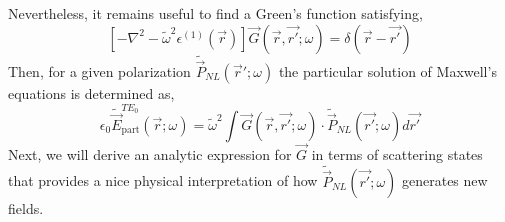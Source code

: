 \documentclass[12pt]{article}
\begin{document}
Nevertheless, it remains useful to find a Green’s function satisfying,
\begin{equation*}
\left[ -\nabla^2 - \tilde{\omega}^2 \epsilon^{(1)}(\vec{r}) \right] \vec{G}(\vec{r}, \vec{r'}; \omega) = \delta(\vec{r} - \vec{r'})
\end{equation*}
Then, for a given polarization $\tilde{\vec{P}}_{NL}(\vec{r}'; \omega)$ the particular solution of Maxwell's equations is determined as,
\begin{equation*}
\epsilon_0 \tilde{\vec{E}}_{\text{part}}^{TE_0}(\vec{r}; \omega) = \tilde{\omega}^2 \int \vec{G}(\vec{r}, \vec{r'}; \omega) \cdot \tilde{\vec{P}}_{NL}(\vec{r'}; \omega) d\vec{r'}
\end{equation*}
Next, we will derive an analytic expression for $\vec{G}$ in terms of scattering states that provides a nice physical interpretation of how $\tilde{\vec{P}}_{NL} (\vec{r'};\omega)$ generates new fields.
\end{document}
